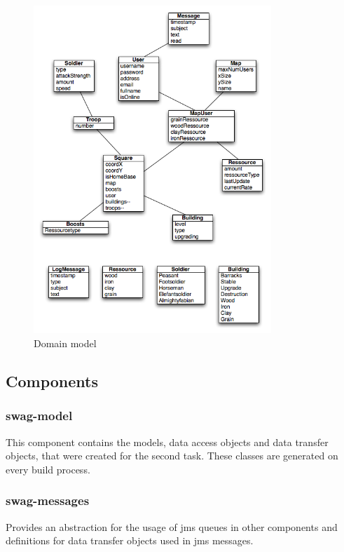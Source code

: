 \documentclass[a4paper]{article}
\begin{document}
\begin{figure}[htb]
\begin{center}
\leavevmode
\includegraphics[width=0.8\textwidth]{Domain.png}
\end{center}
\caption{Domain model}
\end{figure}



\subsection{Components}

\subsubsection{swag-model}
This component contains the models, data access objects and data transfer objects, that were created for the second task. These classes are generated on every build process. 

\subsubsection{swag-messages}
Provides an abstraction for the usage of jms queues in other components and definitions for data transfer objects used in jms messages.
\end{document}
